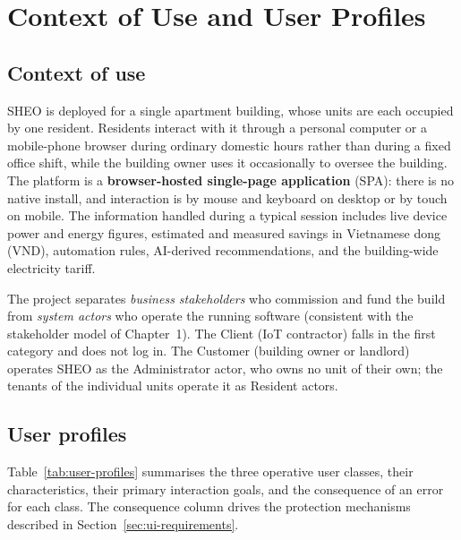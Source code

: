 \section{Context of Use and User Profiles}
\label{sec:ui-context}

\subsection{Context of use}

SHEO is deployed for a single apartment building, whose units are each occupied by one
resident.  Residents interact with it through a personal computer or a mobile-phone
browser during ordinary domestic hours rather than during a fixed office shift, while the
building owner uses it occasionally to oversee the building.  The platform is a
\textbf{browser-hosted single-page application} (SPA): there is no native install, and
interaction is by mouse and keyboard on desktop or by touch on mobile.  The information
handled during a typical session includes live device power and energy figures, estimated
and measured savings in Vietnamese dong (VND), automation rules, AI-derived
recommendations, and the building-wide electricity tariff.

The project separates \emph{business
stakeholders} who commission and fund the build from \emph{system actors} who operate
the running software (consistent with the stakeholder model of Chapter~1).  The Client (IoT contractor) falls in the first category and does
not log in.  The Customer (building owner or landlord) operates SHEO as the
Administrator actor, who owns no unit of their own; the tenants of the individual units
operate it as Resident actors.

\subsection{User profiles}

Table~\ref{tab:user-profiles} summarises the three operative user classes, their
characteristics, their primary interaction goals, and the consequence of an error for
each class.  The consequence column drives the protection mechanisms described in
Section~\ref{sec:ui-requirements}.

